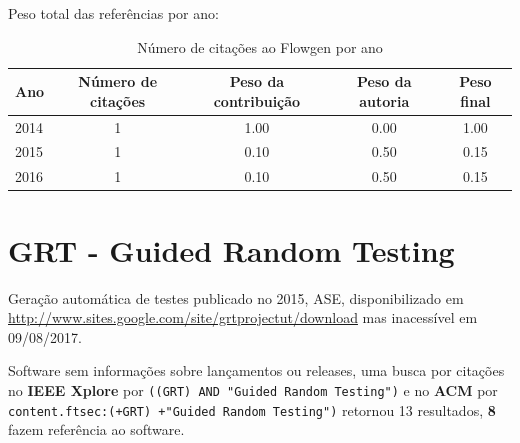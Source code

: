 Peso total das referências por ano:

\begin{table}[h]
\caption{Número de citações ao Flowgen por ano}
\centering
\begin{tabular}{| l | c | c | c | c |}
  \hline
  Ano & Número de citações & Peso da contribuição & Peso da autoria & Peso final \\
  \hline
  2014
    & 1
    & 1.00
    & 0.00
    & 1.00 \\
  2015
    & 1
    & 0.10
    & 0.50
    & 0.15 \\
  2016
    & 1
    & 0.10
    & 0.50
    & 0.15 \\
  \hline
\end{tabular}
\end{table}


\section{GRT - Guided Random Testing}

Geração automática de testes
publicado no 2015, ASE,
disponibilizado em \url{http://www.sites.google.com/site/grtprojectut/download}
mas inacessível em 09/08/2017.

Software sem informações sobre lançamentos ou releases,
uma busca por citações no {\bf IEEE Xplore} por
\texttt{((GRT) AND "Guided Random Testing")}
e no {\bf ACM} por
\texttt{content.ftsec:(+GRT) +"Guided Random Testing")}
retornou
13 resultados,
{\bf 8} fazem referência ao software.

